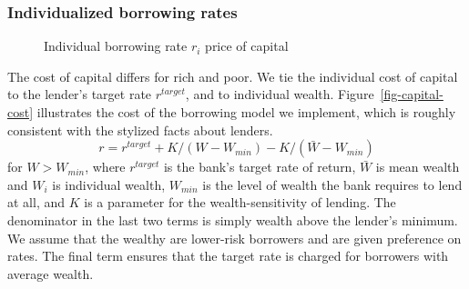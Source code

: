 {%

\subsubsection{Individualized borrowing rates} \label{sec:borowing-rate}

    \begin{figure}
    \centering
    \label{fig-capital-cost}
    \caption{Individual borrowing rate $r_i$ price of capital}
    \label{fig:Wealth-based}
    \end{figure}

The cost of capital differs for rich and poor. We tie the individual cost of capital %
to the lender's target rate $r^{target}$, and to individual wealth. Figure~\ref{fig-capital-cost} illustrates the cost of the borrowing model we implement, which is roughly consistent with the stylized facts about lenders. 
\begin{equation}
{r} = r^{target}+ K/(W-W_{min}) -K/(\bar W - W_{min})\label{eqn-interest-wealth-relationship}
\end{equation}
for $W>W_{min}$, where  $r^{target}$ is the bank's target rate of return,  $\bar{W}$ is mean wealth and $W_i$ is individual wealth, $W_{min}$ is the level of wealth the bank requires to lend at all, and $K$ is a parameter for the wealth-sensitivity of lending. The denominator in the last two terms is simply wealth above the lender's minimum. We assume that the wealthy are lower-risk borrowers and are given preference on rates. The final term ensures that the target rate is charged for borrowers with average wealth.


}
